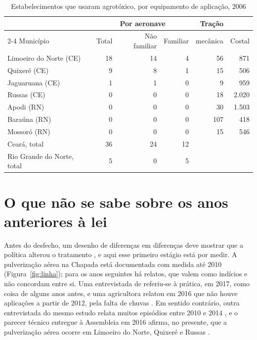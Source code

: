 \begin{table}[htb]
\centering\small
\caption{Estabelecimentos que usaram agrotóxico, por equipamento de aplicação,
2006}
\label{tab:censo}
\begin{tabular}{@{}lrrrrr@{}}
\toprule
 & \multicolumn{3}{c}{Por aeronave} & Tração & \\
\cmidrule(lr){2-4}
Município & Total & Não familiar & Familiar & mecânica & Costal \\
\midrule
Limoeiro do Norte (CE) & 18 & 14 & 4 & 56 & 871 \\
Quixeré (CE)           &  9 &  8 & 1 & 15 & 506 \\
Jaguaruana (CE)        &  1 &  1 & 0 &  9 & 959 \\
Russas (CE)            &  0 &  0 & 0 & 18 & 2.020 \\
Apodi (RN)             &  0 &  0 & 0 & 30 & 1.503 \\
Baraúna (RN)           &  0 &  0 & 0 & 107 & 418 \\
Mossoró (RN)           &  0 &  0 & 0 & 15 & 546 \\
\midrule
Ceará, total           & 36 & 24 & 12 & & \\
Rio Grande do Norte, total & 5 & 0 & 5 & & \\
\bottomrule
\end{tabular}
\end{table}

\section{O que não se sabe sobre os anos anteriores à lei}
\label{sec:quando}

Antes do desfecho, um desenho de diferenças em diferenças deve mostrar que a
política alterou o tratamento \cite{cunningham2021mixtape}, e aqui esse
primeiro estágio está por medir. A pulverização aérea na Chapada está
documentada com medida até 2010 (Figura~\ref{fig:linha}); para os anos
seguintes há relatos, que valem como indícios e não concordam entre si. Uma
entrevistada de  referiu-se à prática, em 2017,
como coisa de alguns anos antes, e uma agricultora relatou em 2016 que não
houve aplicações a partir de 2012, pela falta de chuvas \cite{nogueira2016}. Em sentido contrário, outra entrevistada do mesmo
estudo relata muitos episódios entre 2010 e 2014
\cite[p.~108--109]{aguiar2017}, e o parecer técnico entregue à Assembleia em
2016 afirma, no presente, que a pulverização aérea ocorre em Limoeiro do Norte,
Quixeré e Russas \cite{tramas2016parecer}.

